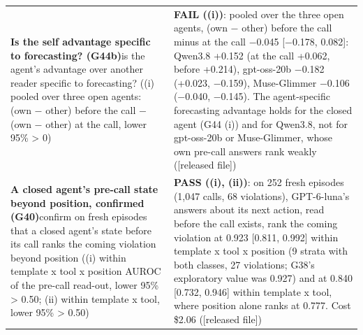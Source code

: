 {\begin{longtable}{p{}p{}}
\textbf{Is the self advantage specific to forecasting? (G44b)}\newline is the agent's advantage over another reader specific to forecasting? ((i) pooled over three open agents: (own $-$ other) before the call $-$ (own $-$ other) at the call, lower 95\% > 0) & \textbf{FAIL ((i))}: pooled over the three open agents, (own $-$ other) before the call minus at the call $-$0.045 [$-$0.178, 0.082]: Qwen3.8 +0.152 (at the call +0.062, before +0.214), gpt-oss-20b $-$0.182 (+0.023, $-$0.159), Muse-Glimmer $-$0.106 ($-$0.040, $-$0.145). The agent-specific forecasting advantage holds for the closed agent (G44 (i)) and for Qwen3.8, not for gpt-oss-20b or Muse-Glimmer, whose own pre-call answers rank weakly ([released file])\\[2pt]
\textbf{A closed agent's pre-call state beyond position, confirmed (G40)}\newline confirm on fresh episodes that a closed agent's state before its call ranks the coming violation beyond position ((i) within template x tool x position AUROC of the pre-call read-out, lower 95\% > 0.50; (ii) within template x tool, lower 95\% > 0.50) & \textbf{PASS ((i), (ii))}: on 252 fresh episodes (1,047 calls, 68 violations), GPT-6-luna's answers about its next action, read before the call exists, rank the coming violation at 0.923 [0.811, 0.992] within template x tool x position (9 strata with both classes, 27 violations; G38's exploratory value was 0.927) and at 0.840 [0.732, 0.946] within template x tool, where position alone ranks at 0.777. Cost \$2.06 ([released file])\\[2pt]
\bottomrule
\end{longtable}}

